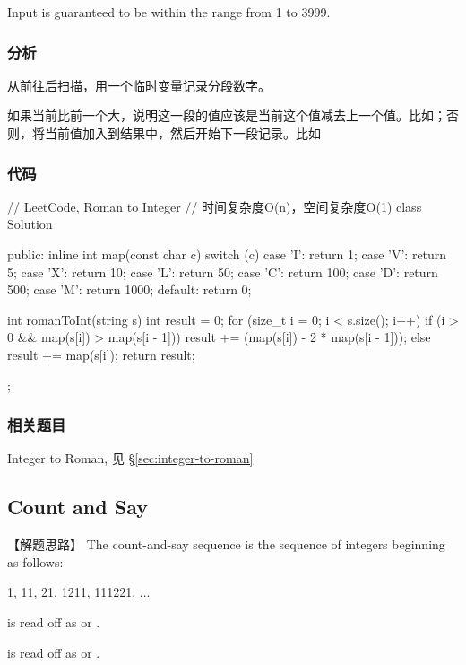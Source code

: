 Input is guaranteed to be within the range from 1 to 3999.


\subsubsection{分析}
从前往后扫描，用一个临时变量记录分段数字。

如果当前比前一个大，说明这一段的值应该是当前这个值减去上一个值。比如；否则，将当前值加入到结果中，然后开始下一段记录。比如


\subsubsection{代码}
\begin{Code}
	// LeetCode, Roman to Integer
	// 时间复杂度O(n)，空间复杂度O(1)
	class Solution {
		public:
		inline int map(const char c) {
			switch (c) {
				case 'I': return 1;
				case 'V': return 5;
				case 'X': return 10;
				case 'L': return 50;
				case 'C': return 100;
				case 'D': return 500;
				case 'M': return 1000;
				default: return 0;
			}
		}
		
		int romanToInt(string s) {
			int result = 0;
			for (size_t i = 0; i < s.size(); i++) {
				if (i > 0 && map(s[i]) > map(s[i - 1])) {
					result += (map(s[i]) - 2 * map(s[i - 1]));
				} else {
				result += map(s[i]);
			}
		}
		return result;
	}
};
\end{Code}


\subsubsection{相关题目}
\begindot
\item Integer to Roman, 见 \S \ref{sec:integer-to-roman}
\myenddot


\subsection{Count and Say} %
\label{sec:count-and-say}


【解题思路】
The count-and-say sequence is the sequence of integers beginning as follows:
\begin{Code}
	1, 11, 21, 1211, 111221, ...
\end{Code}

 is read off as  or .

 is read off as  or .

